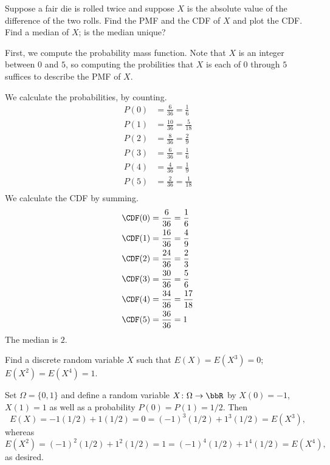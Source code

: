 \begin{problem}[Handout 6, \# 5]
  Suppose a fair die is rolled twice and suppose \(X\) is the absolute
  value of the difference of the two rolls. Find the PMF and the CDF of
  \(X\) and plot the CDF. Find a median of \(X\); is the median unique?
\end{problem}
\begin{solution}
  First, we compute the probability mass function. Note that $X$ is an
  integer between $0$ and $5$, so computing the probilities that $X$ is
  each of $0$ through $5$ suffices to describe the PMF of $X$.

  We calculate the probabilities, by counting.
  \begin{align*}
    P(0) &= \frac{6}{36} = \frac{1}{6}\\
    P(1) &= \frac{10}{36} = \frac{5}{18}\\
    P(2) &= \frac{8}{36} = \frac{2}{9}\\
    P(3) &= \frac{6}{36} = \frac{1}{6}\\
    P(4) &= \frac{4}{36} = \frac{1}{9}\\
    P(5) &= \frac{2}{36} = \frac{1}{18}\\
  \end{align*}
  We calculate the CDF by summing.
  \begin{align*}
    \CDF(0) &= \frac{6}{36} = \frac{1}{6}\\
    \CDF(1) &= \frac{16}{36} = \frac{4}{9}\\
    \CDF(2) &= \frac{24}{36} = \frac{2}{3}\\
    \CDF(3) &= \frac{30}{36} = \frac{5}{6}\\
    \CDF(4) &= \frac{34}{36} = \frac{17}{18}\\
    \CDF(5) &= \frac{36}{36} = 1\\
  \end{align*}
  The median is $2$.
\end{solution}
\newpage

\begin{problem}[Handout 6, \# 7]
  Find a discrete random variable \(X\) such that \(E(X)=E(X^3)=0\);
  \(E(X^2)=E(X^4)=1\).
\end{problem}
\begin{solution}
  Set \(\Omega=\{0,1\}\) and define a random variable
  \(X\colon\Omega\to\bbR\) by \(X(0)= -1\), \(X(1)= 1\) as well as a
  probability \(P(0)=P(1)=1/2\). Then
  \[
    E(X)=-1(1/2)+1(1/2)=0=(-1)^3(1/2)+1^3(1/2)=E(X^3),
  \]
  whereas
  \[
    E(X^2)=(-1)^2(1/2)+1^2(1/2)=1=(-1)^4(1/2)+1^4(1/2)=E(X^4),
  \]
  as desired.
\end{solution}
\newpage

